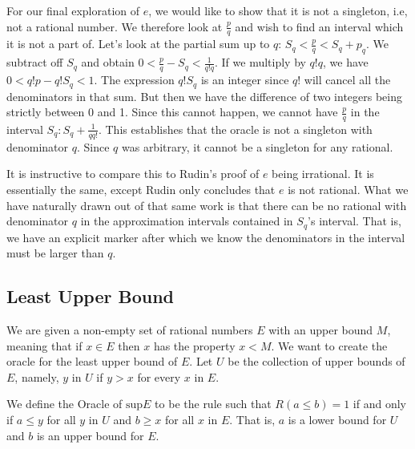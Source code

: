 \documentclass[12pt]{article}
\theoremstyle{remark}
\begin{document}
For our final exploration of $e$, we would like to show that it is not a singleton, i.e, not a rational number. We therefore look at $\tfrac{p}{q}$ and wish to find an interval which it is not a part of.  Let's look at the partial sum up to $q$:  $S_q < \tfrac{p}{q} <  S_q + p_q$. We subtract off $S_q$ and obtain $0 < \tfrac{p}{q} - S_q < \tfrac{1}{q! q}$. If we multiply by $q! q$, we have $0 < q! p - q!S_q < 1$.  The expression $q! S_q$ is an integer since $q!$ will cancel all the denominators in that sum. But then we have the difference of two integers being strictly between 0 and 1. Since this cannot happen, we cannot have $\tfrac{p}{q}$ in the interval $S_q : S_q + \frac{1}{q q!}$. This establishes that the oracle is not a singleton with denominator $q$. Since $q$ was arbitrary, it cannot be a singleton for any rational. 

It is instructive to compare this to Rudin's proof of $e$ being irrational. It is essentially the same, except Rudin only concludes that $e$ is not rational. What we have naturally drawn out of that same work is that there can be no rational with denominator $q$ in the approximation intervals contained in $S_q$'s interval. That is, we have an explicit marker after which we know the denominators in the interval must be larger than $q$. 

\subsection{Least Upper Bound}

We are given a non-empty set of rational numbers $E$ with an upper bound $M$, meaning that if $x \in E$ then $x$ has the property $x < M$. We want to create the oracle for the least upper bound of $E$. Let $U$ be the collection of upper bounds of $E$, namely, $y$ in $U$ if $y > x$ for every $x$ in $E$. 

We define the Oracle of $\mathrm{sup} E$ to be the rule such that $R(a\leq b) = 1$ if and only if $a \leq y$ for all $y$ in $U$ and $b \geq x$ for all $x$ in $E$. That is, $a$ is a lower bound for $U$ and $b$ is an upper bound for $E$.
\end{document}
